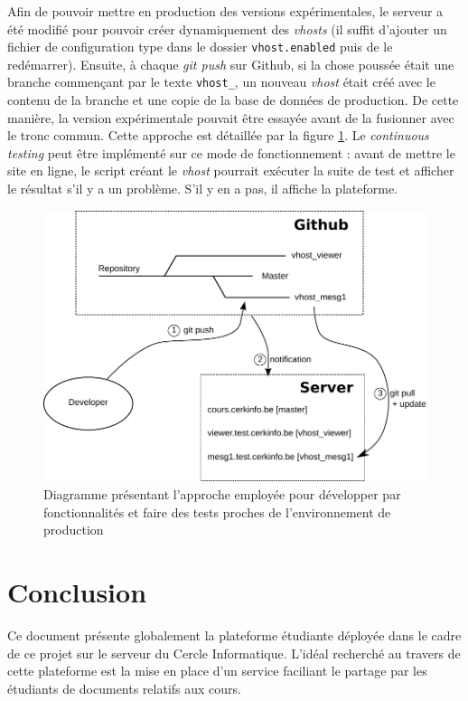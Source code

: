 \documentclass[a4paper,12pt]{article}
\begin{document}
Afin de pouvoir mettre en production des versions expérimentales, le serveur a été
modifié pour pouvoir créer dynamiquement des \textit{vhosts} (il suffit d'ajouter un
fichier de configuration type dans le dossier \texttt{vhost.enabled} puis de le redémarrer).
Ensuite, à chaque \textit{git push} sur Github, si la chose poussée était une
branche commençant par le texte \texttt{vhost\_}, un nouveau \textit{vhost} était créé avec
le contenu de la branche et une copie de la base de données de production.
De cette manière, la version expérimentale pouvait être essayée avant de la
fusionner avec le tronc commun. Cette approche est détaillée par la figure \ref{fig:git}.
Le \textit{continuous testing} peut être implémenté sur ce mode de fonctionnement : avant
de mettre le site en ligne, le script créant le \textit{vhost} pourrait exécuter la suite
de test et afficher le résultat s'il y a un problème. S'il y en a pas, il affiche
la plateforme.

\begin{figure}
  \centering\includegraphics[scale=0.9]{imgs/git.pdf}
  \caption{Diagramme présentant l'approche employée pour développer par fonctionnalités
           et faire des tests proches de l'environnement de production}
  \label{fig:git}
\end{figure}


\section{Conclusion}

Ce document présente globalement la plateforme étudiante déployée dans le cadre de ce projet sur le serveur du
Cercle Informatique. L'idéal recherché au travers de cette plateforme est la mise en place d'un service 
faciliant le partage par les étudiants de documents relatifs aux cours.
\end{document}
